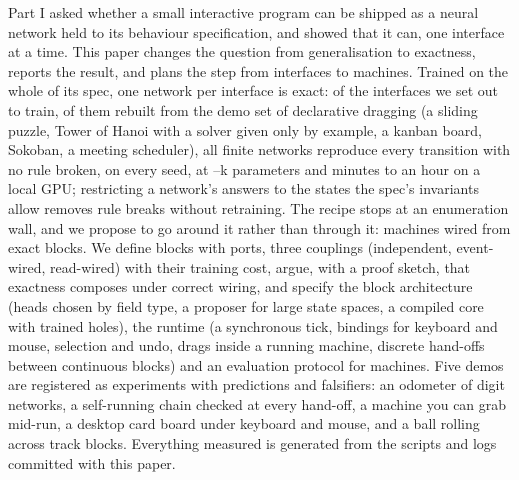 Part I asked whether a small interactive program can be shipped as a neural network held to its behaviour
specification, and showed that it can, one interface at a time. This paper changes the question from
generalisation to exactness, reports the result, and plans the step from interfaces to machines. Trained on the
whole of its spec, one network per interface is exact: of the \nPlanned{} interfaces we set out to train,
\nNewDemos{} of them rebuilt from the demo set of declarative dragging (a sliding puzzle, Tower of Hanoi with a
solver given only by example, a kanban board, Sokoban, a meeting scheduler), all \nFiniteSpecs{} finite networks reproduce every transition with no rule broken, on every seed, at \minParamsK--\maxParamsK k parameters and minutes to an hour on a local GPU;
restricting a network's answers to the states the spec's invariants allow removes rule breaks without
retraining. The recipe stops at an
enumeration wall, and we propose to go around it rather than through it: machines wired from exact blocks. We
define blocks with ports, three couplings (independent, event-wired, read-wired) with their training cost,
argue, with a proof sketch, that exactness composes under correct wiring, and specify the block architecture (heads chosen by field
type, a proposer for large state spaces, a compiled core with trained holes), the runtime (a synchronous tick,
bindings for keyboard and mouse, selection and undo, drags inside a running machine, discrete hand-offs between
continuous blocks) and an evaluation protocol for machines. Five demos are registered as experiments with
predictions and falsifiers: an odometer of digit networks, a self-running chain checked at every hand-off, a
machine you can grab mid-run, a desktop card board under keyboard and mouse, and a ball rolling across track
blocks. Everything measured is generated from the scripts and logs committed with this paper.
